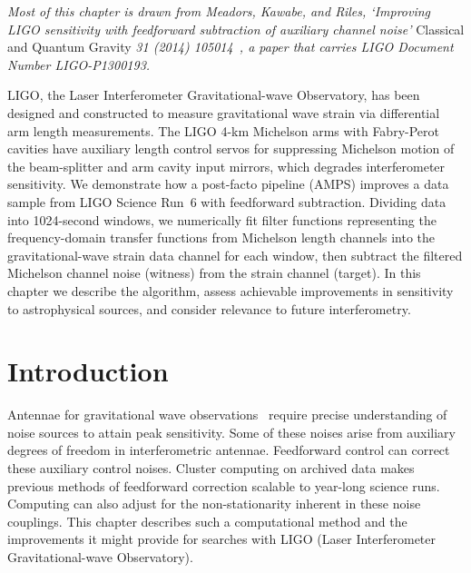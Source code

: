 \textit{Most of this chapter is drawn from Meadors, Kawabe, and Riles, `Improving LIGO sensitivity with feedforward subtraction of auxiliary channel noise'} Classical and Quantum Gravity \textit{31 (2014) 105014~\cite{MeadorsFeedforward2014}, a paper that carries LIGO Document Number LIGO-P1300193. }

LIGO, the Laser Interferometer Gravitational-wave Observatory, has been designed and constructed to measure gravitational wave strain via differential arm length measurements. The LIGO 4-km Michelson arms with Fabry-Perot cavities have auxiliary length control servos for suppressing Michelson motion of the beam-splitter and arm cavity input mirrors, which degrades interferometer sensitivity. We demonstrate how a post-facto pipeline (AMPS) improves a data sample from LIGO Science Run~6 with feedforward subtraction. Dividing data into 1024-second windows, we numerically fit filter functions representing the frequency-domain transfer functions from Michelson length channels into the gravitational-wave strain data channel for each window, then subtract the filtered Michelson channel noise (witness) from the strain channel (target). In this chapter we describe the algorithm, assess achievable improvements in sensitivity to astrophysical sources, and consider relevance to future interferometry.



    \section{Introduction}
    \label{introduction}

Antennae for gravitational wave observations~\cite{Thorne300} require precise understanding of noise sources to attain peak sensitivity. Some of these noises arise from auxiliary degrees of freedom in interferometric antennae. Feedforward control can correct these auxiliary control noises. Cluster computing on archived data makes previous methods of feedforward correction scalable to year-long science runs. Computing can also adjust for the non-stationarity inherent in these noise couplings. This chapter describes such a computational method and the improvements it might provide for searches with LIGO (Laser Interferometer Gravitational-wave Observatory).

